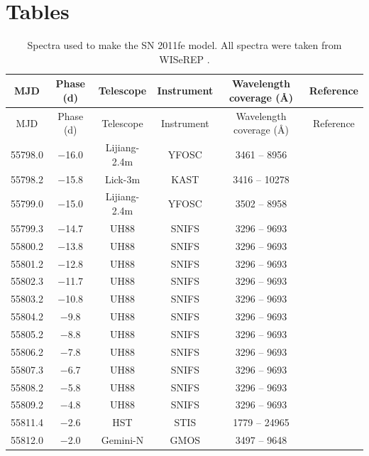 \documentclass[a4paper,oneside,12pt, class=Latex/Classes/PhDthesisPSnPDF, crop=false]{standalone}
\begin{document}
\section{Tables}
\tiny
\begin{longtable}{cccccc}
 \caption{Spectra used to make the SN 2011fe model. All spectra were taken from WISeREP \citep{wiserep}.}
 \label{11fe_sources}
 \endfirsthead
 \hline
 \hline
 MJD  & Phase (d) & Telescope & Instrument & Wavelength coverage (\AA) & Reference    \\
 \hline
 \endhead
 \hline
 \endfoot
 \hline
 \endlastfoot
 \hline
 \hline
 MJD  & Phase (d) & Telescope & Instrument & Wavelength coverage (\AA) & Reference    \\
 \hline
 55798.0 & $-$16.0 & Lijiang-2.4m & YFOSC & 3461 -- 8956 & \citet{spec_Lijiang-2.4m} \\
 55798.2 & $-$15.8 & Lick-3m  & KAST & 3416 -- 10278 & \citet{Nugent_1st_Lick_spec} \\
 55799.0 & $-$15.0 & Lijiang-2.4m & YFOSC & 3502 -- 8958 & \citet{spec_Lijiang-2.4m} \\
 55799.3 & $-$14.7 & UH88   & SNIFS & 3296 -- 9693 & \citet{spec_UH88} \\
 55800.2 & $-$13.8 & UH88   & SNIFS & 3296 -- 9693 & \citet{spec_UH88} \\
 55801.2 & $-$12.8 & UH88   & SNIFS & 3296 -- 9693 & \citet{spec_UH88} \\
 55802.3 & $-$11.7 & UH88   & SNIFS & 3296 -- 9693 & \citet{spec_UH88} \\
 55803.2 & $-$10.8 & UH88   & SNIFS & 3296 -- 9693 & \citet{spec_UH88} \\
 55804.2 & $-$9.8 & UH88   & SNIFS & 3296 -- 9693 & \citet{spec_UH88} \\
 55805.2 & $-$8.8 & UH88   & SNIFS & 3296 -- 9693 & \citet{spec_UH88} \\
 55806.2 & $-$7.8 & UH88   & SNIFS & 3296 -- 9693 & \citet{spec_UH88} \\
 55807.3 & $-$6.7 & UH88   & SNIFS & 3296 -- 9693 & \citet{spec_UH88} \\
 55808.2 & $-$5.8 & UH88   & SNIFS & 3296 -- 9693 & \citet{spec_UH88} \\
 55809.2 & $-$4.8 & UH88   & SNIFS & 3296 -- 9693 & \citet{spec_UH88} \\
 55811.4 & $-$2.6 & HST   & STIS & 1779 -- 24965 & \citet{spec_HST} \\
 55812.0 & $-$2.0 & Gemini-N  & GMOS & 3497 -- 9648 & \citet{spec_Gemini-N} \\

\end{longtable}
\end{document}
